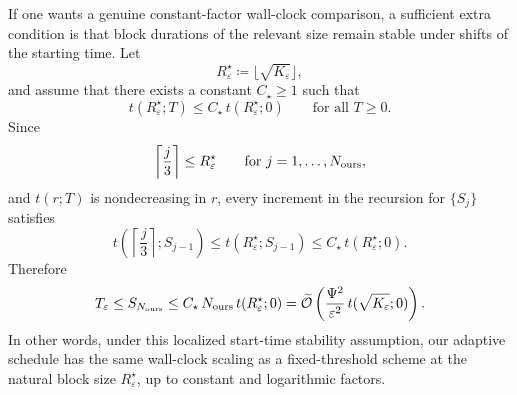 \documentclass{article}
\begin{document}
If one wants a genuine constant-factor wall-clock comparison, a sufficient extra condition is that block durations of the relevant size remain stable under shifts of the starting time.
Let
\begin{equation*}
    R_{\varepsilon}^{\star} \coloneqq \lfloor \sqrt{K_{\varepsilon}} \rfloor,
\end{equation*}
and assume that there exists a constant $C_{\star} \ge 1$ such that
\begin{equation*}
    t(R_{\varepsilon}^{\star};T)
    \le
    C_{\star}\, t(R_{\varepsilon}^{\star};0)
    \qquad \text{for all } T \ge 0.
\end{equation*}
Since
\begin{equation*}
    \left\lceil \frac{j}{3} \right\rceil \le R_{\varepsilon}^{\star}
    \qquad \text{for } j = 1,\dots,N_{\rm ours},
\end{equation*}
and $t(r;T)$ is nondecreasing in $r$, every increment in the recursion for $\{S_j\}$ satisfies
\begin{equation*}
    t\!\left(\left\lceil \frac{j}{3} \right\rceil;S_{j-1}\right)
    \le
    t(R_{\varepsilon}^{\star};S_{j-1})
    \le
    C_{\star}\, t(R_{\varepsilon}^{\star};0).
\end{equation*}
Therefore
\begin{equation*}
    T_{\varepsilon}
    \le
    S_{N_{\rm ours}}
    \le
    C_{\star}\, N_{\rm ours}\, t(R_{\varepsilon}^{\star};0)
    =
    \widetilde{\mathcal{O}}\left(
        \frac{\Psi^2}{\varepsilon^2}\, t(\sqrt{K_{\varepsilon}};0)
    \right).
\end{equation*}
In other words, under this localized start-time stability assumption, our adaptive schedule has the same wall-clock scaling as a fixed-threshold scheme at the natural block size $R_{\varepsilon}^{\star}$, up to constant and logarithmic factors.


\newpage

\end{document}
